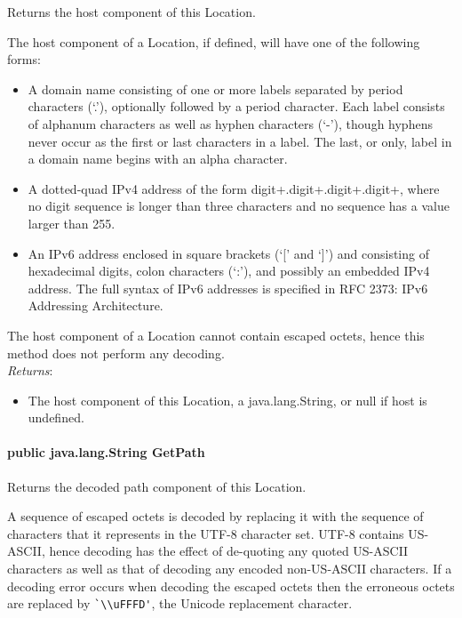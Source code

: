 \documentclass[$Date: 2003/06/26 19:29:31 $]{glabarticle}
\begin{document}
 Returns the host component of this Location.

 The host component of a Location, if defined, will have one of the  following forms: 
\begin{itemize}
 \item  A domain name consisting of one or more labels    separated by period characters (`.'), optionally 
 followed by    a period character.  Each label consists of alphanum characters    as well as hyphen characters 
 (`-'), though hyphens never    occur as the first or last characters in a label.  The last, or only,    label in a 
 domain name begins with an alpha    character. 
 \item A dotted-quad IPv4 address of the form    digit+.digit+.digit+.digit+,    where no digit sequence is 
 longer than three characters and no sequence has a value larger than 255. 

 \item An IPv6 address enclosed in square brackets (`[' and    `]') and consisting of hexadecimal digits, colon 
 characters    (`:'), and possibly an embedded IPv4 address.  The full    syntax of IPv6 addresses is specified in 
 RFC 2373: IPv6    Addressing Architecture.  
 \end{itemize}
 The host component of a Location cannot contain escaped octets, hence this  method does not perform 
 any decoding.\\
 
 \textit{Returns}:
 \begin{itemize}
 \item[] The host component of this Location, a java.lang.String, or null if host is undefined.
 \end{itemize}
 
 \paragraph{public java.lang.String GetPath}
 
 Returns the decoded path component of this Location.
 
 A sequence of escaped octets is decoded by replacing it with the
 sequence of characters that it represents in the UTF-8 character set.
 UTF-8 contains US-ASCII, hence decoding has the effect of de-quoting
 any quoted US-ASCII characters as well as that of decoding any
 encoded non-US-ASCII characters.  If a decoding error occurs when
 decoding the escaped octets then the erroneous octets are replaced by
 \verb"`\\uFFFD'", the Unicode replacement character.
\end{document}

